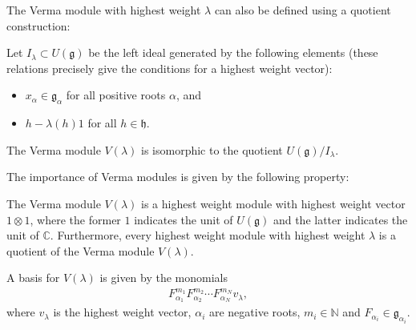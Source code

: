     The Verma module with highest weight $\lambda$ can also be defined using a quotient construction:
    \begin{adefinition}
        Let $I_\lambda\subset U(\mathfrak{g})$ be the left ideal generated by the following elements (these relations precisely give the conditions for a highest weight vector):
        \begin{itemize}
            \item $x_\alpha\in\mathfrak{g_\alpha}$ for all positive roots $\alpha$, and
            \item $h-\lambda(h)1$ for all $h\in\mathfrak{h}$.
        \end{itemize}
        The Verma module $V(\lambda)$ is isomorphic to the quotient $U(\mathfrak{g})/I_\lambda$.
    \end{adefinition}

    The importance of Verma modules is given by the following property:
    \begin{property}
        The Verma module $V(\lambda)$ is a highest weight module with highest weight vector $1\otimes1$, where the former $1$ indicates the unit of $U(\mathfrak{g})$ and the latter indicates the unit of $\mathbb{C}$. Furthermore, every highest weight module with highest weight $\lambda$ is a quotient of the Verma module $V(\lambda)$.
    \end{property}

    \begin{property}
         A basis for $V(\lambda)$ is given by the monomials
         \begin{gather}
             F_{\alpha_1}^{m_1}F_{\alpha_2}^{m_2}\cdots F_{\alpha_N}^{m_N}v_\lambda,
         \end{gather}
         where $v_\lambda$ is the highest weight vector, $\alpha_i$ are negative roots, $m_i\in\mathbb{N}$ and $F_{\alpha_i}\in\mathfrak{g}_{\alpha_i}$.
    \end{property}

